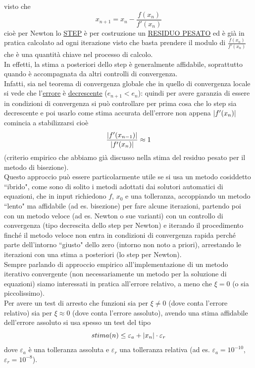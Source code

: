 visto che 
\[x_{n+1} = x_n - \frac{f(x_n)}{f'(x_n)}\]
cioè per Newton lo \uline{STEP} è per costruzione un \uline{RESIDUO PESATO} ed è già in pratica calcolato ad ogni iterazione visto che basta prendere il modulo di $\frac{f(x_n)}{f'(x_n)}$ che è una quantità chiave nel processo di calcolo.\\
In effetti, la stima a posteriori dello step è generalmente affidabile, soprattutto quando è accompagnata da altri controlli di convergenza.\\
Infatti, sia nel teorema di convergenza globale che in quello di convergenza locale si vede che l'\uline{errore} è \uline{decrescente} ($e_{n+1} < e_n$): quindi per avere garanzia di essere in condizioni di convergenza si può controllare per prima cosa che lo step sia decrescente e poi usarlo come stima accurata dell'errore non appena $\lvert f'(x_n)\rvert$ comincia a stabilizzarsi cioè 
\[\frac{\lvert f'(x_{n-1})\rvert}{\lvert f'(x_n)\rvert} \approx 1\] 
(criterio empirico che abbiamo già discusso nella stima del residuo pesato per il metodo di bisezione).\\
Questo approccio può essere particolarmente utile se si usa un metodo cosiddetto ``ibrido", come sono di solito i metodi adottati dai solutori automatici di equazioni, che in input richiedono $f$, $x_0$ e una tolleranza, accoppiando un metodo ``lento" ma affidabile (ad es. bisezione) per fare alcune iterazioni, partendo poi con un metodo veloce (ad es. Newton o sue varianti) con un controllo di convergenza (tipo decrescita dello step per Newton) e iterando il procedimento finché il metodo veloce non entra in condizioni di convergenza rapida perché parte dell'intorno ``giusto" dello zero (intorno non noto a priori), arrestando le iterazioni con una stima a posteriori (lo step per Newton).\\
Sempre parlando di approccio empirico all'implementazione di un metodo iterativo convergente (non necessariamente un metodo per la soluzione di equazioni) siamo interessati in pratica all'errore relativo, a meno che $\xi = 0$ (o sia piccolissimo).\\
Per avere un test di arresto che funzioni sia per $\xi \neq 0$ (dove conta l'errore relativo) sia per $\xi \approx 0$ (dove conta l'errore assoluto), avendo una stima affidabile dell'errore assoluto si usa spesso un test del tipo
\[stima(n) \leq \varepsilon_a + \lvert x_n\rvert \cdot \varepsilon_r\]
dove $\varepsilon_a$ è una tolleranza assoluta e $\varepsilon_r$ una tolleranza relativa (ad es. $\varepsilon_a = 10^{-10}$, $\varepsilon_r = 10^{-8}$).\\
